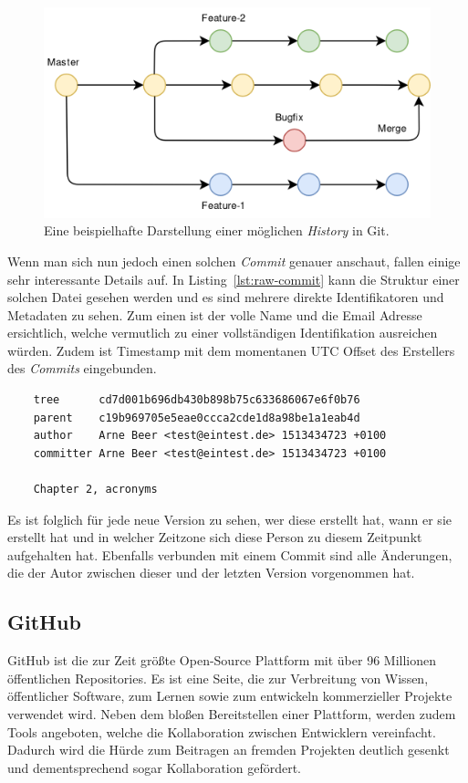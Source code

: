 \documentclass[12pt,a4paper]{article}
\begin{document}
\begin{figure}[H]
    \includegraphics[scale=0.25]{./gfx/git-history-branch.png}
    \centering
    \caption{Eine beispielhafte Darstellung einer möglichen \emph{History} in Git.}\label{fig:git-history}
\end{figure}

Wenn man sich nun jedoch einen solchen \emph{Commit} genauer anschaut, fallen einige sehr interessante Details auf.
In Listing~\ref{lst:raw-commit} kann die Struktur einer solchen Datei gesehen werden und es sind mehrere direkte Identifikatoren und Metadaten zu sehen.
Zum einen ist der volle Name und die Email Adresse ersichtlich, welche vermutlich zu einer vollständigen Identifikation ausreichen würden.
Zudem ist Timestamp mit dem momentanen UTC Offset des Erstellers des \emph{Commits} eingebunden.

\begin{verbatim}
    tree      cd7d001b696db430b898b75c633686067e6f0b76
    parent    c19b969705e5eae0ccca2cde1d8a98be1a1eab4d
    author    Arne Beer <test@eintest.de> 1513434723 +0100
    committer Arne Beer <test@eintest.de> 1513434723 +0100

    Chapter 2, acronyms
\end{verbatim}
\begingroup
{}
\endgroup

Es ist folglich für jede neue Version zu sehen, wer diese erstellt hat, wann er sie erstellt hat und in welcher Zeitzone sich diese Person zu diesem Zeitpunkt aufgehalten hat.
Ebenfalls verbunden mit einem Commit sind alle Änderungen, die der Autor zwischen dieser und der letzten Version vorgenommen hat.


\subsection{GitHub}
GitHub ist die zur Zeit größte Open-Source Plattform mit über 96 Millionen öffentlichen Repositories.
Es ist eine Seite, die zur Verbreitung von Wissen, öffentlicher Software, zum Lernen sowie zum entwickeln kommerzieller Projekte verwendet wird.
Neben dem bloßen Bereitstellen einer Plattform, werden zudem Tools angeboten, welche die Kollaboration zwischen Entwicklern vereinfacht.
Dadurch wird die Hürde zum Beitragen an fremden Projekten deutlich gesenkt und dementsprechend sogar Kollaboration gefördert.
\end{document}

